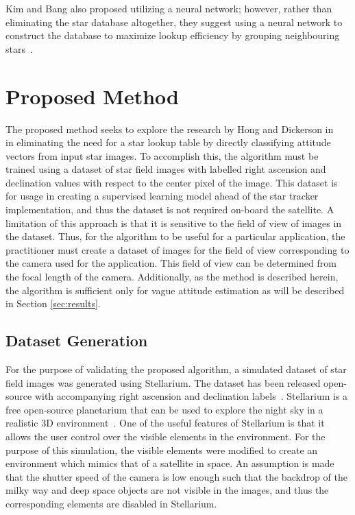 \documentclass[10pt,twocolumn,letterpaper]{article}
\begin{document}
Kim and Bang also proposed utilizing a neural network; however, rather than eliminating the star database altogether, they suggest using a neural network to construct the database to maximize lookup efficiency by grouping neighbouring stars~\cite{neural2}.




\section{Proposed Method}
\label{sec:method}

The proposed method seeks to explore the research by Hong and Dickerson in ~\cite{neural1} in eliminating the need for a star lookup table by directly classifying attitude vectors from input star images. To accomplish this, the algorithm must be trained using a dataset of star field images with labelled right ascension and declination values with respect to the center pixel of the image. This dataset is for usage in creating a supervised learning model ahead of the star tracker implementation, and thus the dataset is not required on-board the satellite. A limitation of this approach is that it is sensitive to the field of view of images in the dataset. Thus, for the algorithm to be useful for a particular application, the practitioner must create a dataset of images for the field of view corresponding to the camera used for the application. This field of view can be determined from the focal length of the camera. Additionally, as the method is described herein, the algorithm is sufficient only for vague attitude estimation as will be described in Section \ref{sec:results}.

\subsection{Dataset Generation}

For the purpose of validating the proposed algorithm, a simulated dataset of star field images was generated using Stellarium. The dataset has been released open-source with accompanying right ascension and declination labels~\cite{kaggle}. Stellarium is a free open-source planetarium that can be used to explore the night sky in a realistic 3D environment~\cite{stellarium}. One of the useful features of Stellarium is that it allows the user control over the visible elements in the environment. For the purpose of this simulation, the visible elements were modified to create an environment which mimics that of a satellite in space. An assumption is made that the shutter speed of the camera is low enough such that the backdrop of the milky way and deep space objects are not visible in the images, and thus the corresponding elements are disabled in Stellarium.
\end{document}
